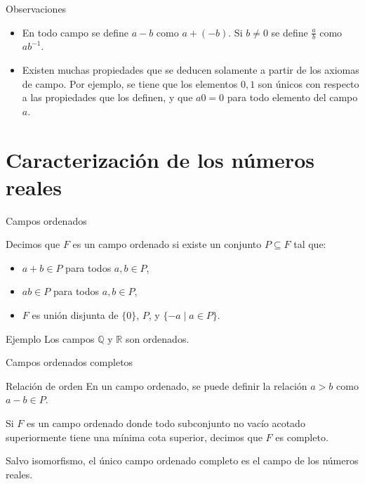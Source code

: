 \documentclass[spanish,presentation]{beamer}
\begin{document}
\begin{frame}[label=sec-1-3]{Observaciones}
\begin{itemize}
\item En todo campo se define \(a-b\) como \(a+(-b)\). Si \(b\ne 0\) se
define \(\frac{a}{b}\) como \(ab^{-1}\).
\item Existen muchas propiedades que se deducen solamente a partir de los
axiomas de campo. Por ejemplo, se tiene que los elementos \(0,1\)
son únicos con respecto a las propiedades que los definen, y que
\(a0=0\) para todo elemento del campo \(a\).
\end{itemize}
\end{frame}

\section{Caracterización de los números reales}
\label{sec-2}

\begin{frame}[label=sec-2-1]{Campos ordenados}
\begin{definition}
Decimos que \(F\) es un \alert{campo ordenado} si existe un conjunto
\(P\subseteq F\) tal que:

\begin{itemize}
\item \(a+b\in P\) para todos \(a,b\in P\),
\item \(ab\in P\) para todos \(a,b\in P\),
\item \(F\) es unión disjunta de \(\{0\}\), \(P\), y \(\{-a\mid a\in P\}\).
\end{itemize}
\end{definition}

\begin{exampleblock}{Ejemplo}
Los campos \(\mathbb{Q}\) y \(\mathbb{R}\) son ordenados.
\end{exampleblock}
\end{frame}

\begin{frame}[label=sec-2-2]{Campos ordenados completos}
\begin{block}{Relación de orden}
En un campo ordenado, se puede definir la relación \(a>b\) como
\(a-b\in P\).
\end{block}

\begin{definition}
Si \(F\) es un campo ordenado donde todo subconjunto no vacío
acotado superiormente tiene una mínima cota superior, decimos que
\(F\) es \alert{completo}.
\end{definition}

\begin{theorem}
Salvo isomorfismo, el único campo ordenado completo es el campo de
los números reales.
\end{theorem}
\end{frame}
\end{document}
